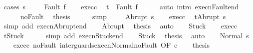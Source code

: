 \begin{isabellebody}
%
\isadelimproof
%
\endisadelimproof
%
\isatagproof
{}\isamarkupfalse%
\ {\isacharparenleft}cases\ s{\isacharparenright}\ \isanewline
\ \ \isamarkupfalse%
\ {\isacharparenleft}Fault\ f{\isacharparenright}\isanewline
\ \ \isamarkupfalse%
\ exec{\isacharunderscore}c\ \isamarkupfalse%
\ {\isachardoublequoteopen}t\ {\isacharequal}\ Fault\ f{\isachardoublequoteclose}\isanewline
\ \ \ \ \isamarkupfalse%
\ {\isacharparenleft}auto\ intro{\isacharcolon}\ execn{\isacharunderscore}Fault{\isacharunderscore}end{\isacharparenright}\isanewline
\ \ \ \ \isamarkupfalse%
\ noFault\ \isamarkupfalse%
\ {\isacharquery}thesis\isanewline
\ \ \ \ \isamarkupfalse%
\ simp\ \isanewline
{}\isamarkupfalse%
\isanewline
\ \ \isamarkupfalse%
\ {\isacharparenleft}Abrupt\ s{\isacharprime}{\isacharparenright}\isanewline
\ \ \isamarkupfalse%
\ exec{\isacharunderscore}c\ \isamarkupfalse%
\ {\isachardoublequoteopen}t{\isacharequal}Abrupt\ s{\isacharprime}{\isachardoublequoteclose}\isanewline
\ \ \ \ \isamarkupfalse%
\ {\isacharparenleft}simp\ add{\isacharcolon}\ execn{\isacharunderscore}Abrupt{\isacharunderscore}end{\isacharparenright}\isanewline
\ \ \isamarkupfalse%
\ Abrupt\ \isamarkupfalse%
\ {\isacharquery}thesis\ \isamarkupfalse%
\ auto\isanewline
{}\isamarkupfalse%
\isanewline
\ \ \isamarkupfalse%
\ Stuck\isanewline
\ \ \isamarkupfalse%
\ exec{\isacharunderscore}c\ \isamarkupfalse%
\ {\isachardoublequoteopen}t{\isacharequal}Stuck{\isachardoublequoteclose}\isanewline
\ \ \ \ \isamarkupfalse%
\ {\isacharparenleft}simp\ add{\isacharcolon}\ execn{\isacharunderscore}Stuck{\isacharunderscore}end{\isacharparenright}\isanewline
\ \ \isamarkupfalse%
\ Stuck\ \isamarkupfalse%
\ {\isacharquery}thesis\ \isamarkupfalse%
\ auto\isanewline
{}\isamarkupfalse%
\isanewline
\ \ \isamarkupfalse%
\ {\isacharparenleft}Normal\ s{\isacharprime}{\isacharparenright}\isanewline
\ \ \isamarkupfalse%
\ exec{\isacharunderscore}c\ noFault\ inter{\isacharunderscore}guards{\isacharunderscore}execn{\isacharunderscore}Normal{\isacharunderscore}noFault\ {\isacharbrackleft}OF\ c{\isacharbrackright}\isanewline
\ \ \isamarkupfalse%
\ {\isacharquery}thesis\isanewline
\ \ \ \ \isamarkupfalse%

\end{isabellebody}
